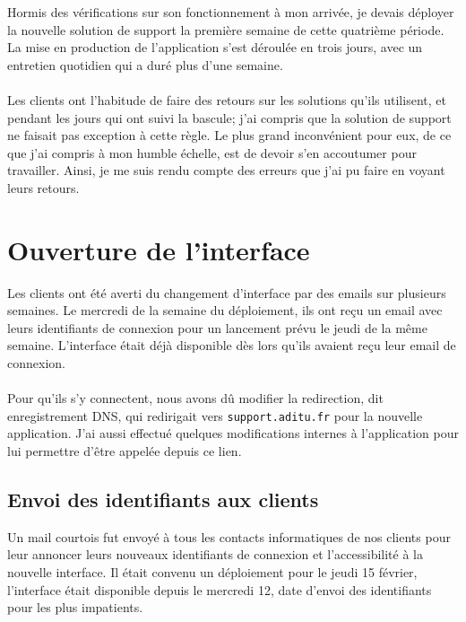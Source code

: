 \renewcommand{\figurename}{}

Hormis des vérifications sur son fonctionnement à mon arrivée, je devais déployer la nouvelle solution de support la première semaine de cette quatrième période. La mise en production de l'application s'est déroulée en trois jours, avec un entretien quotidien qui a duré plus d'une semaine.
\\ \\
Les clients ont l'habitude de faire des retours sur les solutions qu'ils utilisent, et pendant les jours qui ont suivi la bascule; j'ai compris que la solution de support ne faisait pas exception à cette règle. Le plus grand inconvénient pour eux, de ce que j'ai compris à mon humble échelle, est de devoir s'en accoutumer pour travailler. Ainsi, je me suis rendu compte des erreurs que j'ai pu faire en voyant leurs retours.


\section{Ouverture de l'interface}

Les clients ont été averti du changement d'interface par des emails sur plusieurs semaines. Le mercredi de la semaine du déploiement, ils ont reçu un email avec leurs identifiants de connexion pour un lancement prévu le jeudi de la même semaine. L'interface était déjà disponible dès lors qu'ils avaient reçu leur email de connexion.
\\ \\
Pour qu'ils s'y connectent, nous avons dû modifier la redirection, dit enregistrement DNS, qui redirigait vers \texttt{support.aditu.fr} pour la nouvelle application. J'ai aussi effectué quelques modifications internes à l'application pour lui permettre d'être appelée depuis ce lien.

\subsection{Envoi des identifiants aux clients}

Un mail courtois fut envoyé à tous les contacts informatiques de nos clients pour leur annoncer leurs nouveaux identifiants de connexion et l'accessibilité à la nouvelle interface. Il était convenu un déploiement pour le jeudi 15 février, l'interface était disponible depuis le mercredi 12, date d'envoi des identifiants pour les plus impatients.

